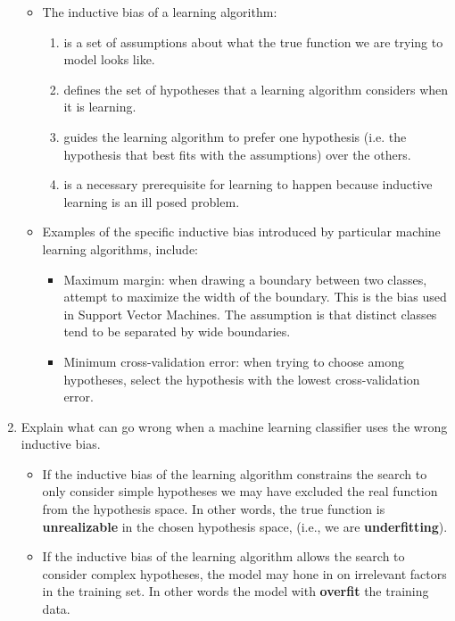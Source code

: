 \documentclass[solution]{ditpaper}
\begin{document}
\begin{enumerate}
\begin{answer}
		\begin{itemize}
				\item The inductive bias of a learning algorithm:
				\begin{enumerate}
					\item is a set of assumptions about what the true function we are trying to model looks like.
					\item defines the set of hypotheses that a learning algorithm considers when it is learning.
					\item guides the learning algorithm to prefer one hypothesis (i.e. the hypothesis that best fits with the assumptions) over the others. 
					\item is a necessary prerequisite for learning to happen because inductive learning is an ill posed problem. 
				\end{enumerate}	
				\item Examples of the specific inductive bias introduced by particular machine learning algorithms, include:		
				\begin{itemize}
					\item Maximum margin: when drawing a boundary between two classes, attempt to maximize the width of the boundary. This is the bias used in Support Vector Machines. The assumption is that distinct classes tend to be separated by wide boundaries.
					\item Minimum cross-validation error: when trying to choose among hypotheses, select the hypothesis with the lowest cross-validation error.
				\end{itemize}
			\end{itemize}
	\end{answer}

	\item Explain what can go wrong when a machine learning classifier uses the wrong inductive bias.
\begin{answer}
			\begin{itemize}
				\item If the inductive bias of the learning algorithm constrains the search to only consider simple hypotheses we may have excluded the real function from the hypothesis space. In other words, the true function is \textbf{unrealizable} in the chosen hypothesis space, (i.e., we are \textbf{underfitting}). 
				\item If the inductive bias of the learning algorithm allows the search to consider complex hypotheses, the model may hone in on irrelevant factors in the training set. In other words the model with \textbf{overfit} the training data.
			\end{itemize}
\end{answer}


\end{enumerate}
\end{document}
